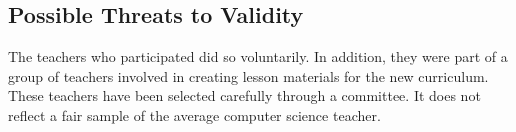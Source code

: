 \subsection{Possible Threats to Validity}
The teachers who participated did so voluntarily. In addition, they were part of a group of teachers involved in creating lesson materials for the new curriculum. These teachers have been selected carefully through a committee. It does not reflect a fair sample of the average computer science teacher.
